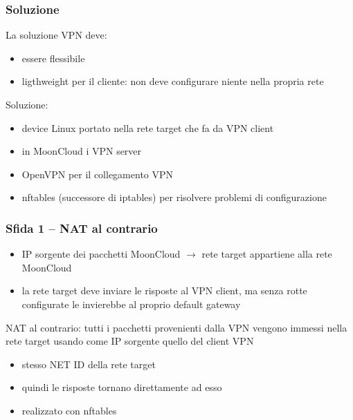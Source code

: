 \begin{frame}
    \frametitle{Soluzione}
    La soluzione VPN deve:
    \begin{itemize}
        \item essere \alert{flessibile}
        \item \alert{ligthweight} per il cliente: non deve configurare niente
        nella propria rete
    \end{itemize}

    Soluzione:
    \begin{itemize}
        \item device \alert{Linux} portato nella rete target che fa da VPN client
        \item in MoonCloud i VPN server
        \item \alert{OpenVPN} per il collegamento VPN 
        \item \alert{nftables} (successore
        di \alert{iptables}) per risolvere problemi di configurazione
    \end{itemize}
\end{frame}


\begin{frame}
    \frametitle{Sfida 1 -- NAT al contrario}

    \begin{itemize}
        \item<1-> IP sorgente dei pacchetti MoonCloud $\rightarrow$ rete target
        appartiene alla rete MoonCloud
        \item<2-> la rete target deve inviare le risposte al VPN client, ma senza
        rotte configurate le invierebbe al proprio default gateway
    \end{itemize}

    \alert{NAT al contrario}: tutti i pacchetti provenienti dalla VPN vengono
    immessi nella rete target usando come IP sorgente quello del client VPN
    \begin{itemize}
        \item stesso NET ID della rete target
        \item quindi le risposte tornano direttamente ad esso
        \item realizzato con \alert{nftables}
    \end{itemize}
\end{frame}

